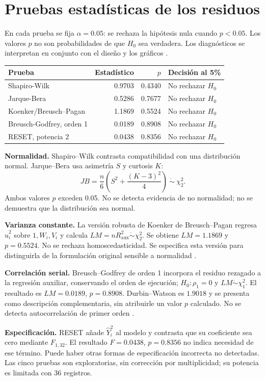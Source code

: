 \documentclass[11pt,a4paper]{article}
\begin{document}
\section{Pruebas estadísticas de los residuos}
En cada prueba se fija $\alpha=0.05$: se rechaza la hipótesis nula cuando $p<0.05$. Los valores $p$ no son probabilidades de que $H_0$ sea verdadera. Los diagnósticos se interpretan en conjunto con el diseño y los gráficos \cite{nist,statsmodels}.
\begin{center}\small
\begin{tabular}{p{5.1cm}rrp{3.5cm}}\toprule
Prueba & Estadístico & $p$ & Decisión al 5\%\\\midrule
Shapiro-Wilk & 0.9703 & 0.4340 & No rechazar $H_0$\\
Jarque-Bera & 0.5286 & 0.7677 & No rechazar $H_0$\\
Koenker/Breusch--Pagan & 1.1869 & 0.5524 & No rechazar $H_0$\\
Breusch-Godfrey, orden 1 & 0.0189 & 0.8908 & No rechazar $H_0$\\
RESET, potencia 2 & 0.0438 & 0.8356 & No rechazar $H_0$\\
\bottomrule\end{tabular}\end{center}
\textbf{Normalidad.} Shapiro--Wilk contrasta compatibilidad con una distribución normal. Jarque--Bera usa asimetría $S$ y curtosis $K$:
\[
JB=\frac{n}{6}\left(S^2+\frac{(K-3)^2}{4}\right)\ \dot\sim\ \chi^2_2.
\]
Ambos valores $p$ exceden 0.05. No se detecta evidencia de no normalidad; no se demuestra que la distribución sea normal.

\textbf{Varianza constante.} La versión robusta de Koenker de Breusch--Pagan regresa $\hat u_i^2$ sobre $1,W_i,V_i$ y calcula $LM=nR^2_{\mathrm{aux}}\dot\sim\chi^2_2$. Se obtiene $LM=1.1869$ y $p=0.5524$. No se rechaza homoscedasticidad. Se especifica esta versión para distinguirla de la formulación original sensible a normalidad \cite{bpdoc}.

\textbf{Correlación serial.} Breusch--Godfrey de orden 1 incorpora el residuo rezagado a la regresión auxiliar, conservando el orden de ejecución; $H_0:\rho_1=0$ y $LM\dot\sim\chi^2_1$. El resultado es $LM=0.0189$, $p=0.8908$. Durbin--Watson es $1.9018$ y se presenta como descripción complementaria, sin atribuirle un valor $p$ calculado. No se detecta autocorrelación de primer orden \cite{bgdoc}.

\textbf{Especificación.} RESET añade $\widehat Y_i^2$ al modelo y contrasta que su coeficiente sea cero mediante $F_{1,32}$. El resultado $F=0.0438$, $p=0.8356$ no indica necesidad de ese término. Puede haber otras formas de especificación incorrecta no detectadas. Las cinco pruebas son exploratorias, sin corrección por multiplicidad; su potencia es limitada con 36 registros.
\end{document}
